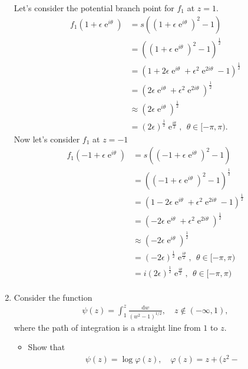 \documentclass[10pt]{amsart}
\newcommand{\D}{\mathrm{d}}
\DeclareMathOperator{\E}{e}
\theoremstyle{nonumberplain}
\begin{document}
\begin{enumerate}[label={\bf {\arabic*}:}]
\noindent
Let's consider the potential branch point for $f_1$ at $z=1$.
\begin{align*}
f_1(1 + \epsilon \E^{i \theta}) &= s\left(\left(1 + \epsilon \E^{i \theta} \right)^2 - 1\right) \\
					    &= \left(\left(1 + \epsilon \E^{i \theta} \right)^2  - 1 \right)^{\frac{1}{2}} \\
					    &= \left(1 + 2 \epsilon \E^{i \theta} + \epsilon^2\E^{2 i \theta}  - 1 \right)^{\frac{1}{2}} \\
					    &= \left(2 \epsilon \E^{i \theta} + \epsilon^2\E^{2 i \theta}\right)^{\frac{1}{2}} \\	
					    &\approx \left(2 \epsilon \E^{i \theta}\right)^{\frac{1}{2}} \\
					    &= \left(2 \epsilon\right)^{\frac{1}{2}} \E^{\frac{i \theta}{2}}, \:\: \theta \in [-\pi, \pi).
\end{align*}
Now let's consider $f_1$ at $z=-1$
\begin{align*}
f_1(-1 + \epsilon \E^{i \theta}) &= s\left(\left(-1 + \epsilon \E^{i \theta} \right)^2 - 1\right) \\
					    &= \left(\left(-1 + \epsilon \E^{i \theta} \right)^2  - 1 \right)^{\frac{1}{2}} \\
					    &= \left(1 - 2 \epsilon \E^{i \theta} + \epsilon^2\E^{2 i \theta}  - 1 \right)^{\frac{1}{2}} \\
					    &= \left(- 2 \epsilon \E^{i \theta} + \epsilon^2\E^{2 i \theta}\right)^{\frac{1}{2}} \\	
					    &\approx \left(-2 \epsilon \E^{i \theta}\right)^{\frac{1}{2}} \\
					    &= \left(-2 \epsilon\right)^{\frac{1}{2}} \E^{\frac{i \theta}{2}}, \:\: \theta \in [-\pi, \pi) \\
					    &= i \left(2 \epsilon\right)^{\frac{1}{2}} \E^{\frac{i \theta}{2}}, \:\: \theta \in [-\pi, \pi) \\
\end{align*}
  \item Consider the function
    \begin{align*}
     \psi(z) = \int_1^z \frac{\D w}{(w^2 - 1)^{1/2}}, \quad z \not \in
      (-\infty, 1),
    \end{align*}
    where the path of integration is a straight line from $1$ to $z$.
    \begin{itemize}
   \item  Show that
    \begin{align*}
      \psi(z) = \log \varphi(z), \quad \varphi(z) = z + (z^2 -

\end{align*}
\end{itemize}
\end{enumerate}
\end{document}
